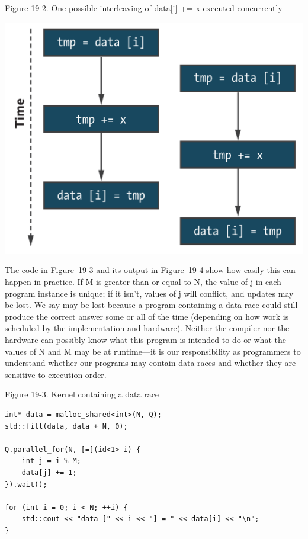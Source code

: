 \hspace*{\fill} \par %
Figure 19-2. One possible interleaving of data[i] += x executed 
concurrently
\begin{center}
	\includegraphics[width=1.0\textwidth]{content/chapter-19/images/3}
\end{center}

The code in Figure 19-3 and its output in Figure 19-4 show how easily this can happen in practice. If M is greater than or equal to N, the value of j in each program instance is unique; if it isn’t, values of j will conflict, and updates may be lost. We say may be lost because a program containing a data race could still produce the correct answer some or all of the time (depending on how work is scheduled by the implementation and hardware). Neither the compiler nor the hardware can possibly know what this program is intended to do or what the values of N and M may be at runtime—it is our responsibility as programmers to understand whether our programs may contain data races and whether they are sensitive to execution order.\par

\hspace*{\fill} \par %
Figure 19-3. Kernel containing a data race
\begin{lstlisting}[caption={}]
int* data = malloc_shared<int>(N, Q);
std::fill(data, data + N, 0);

Q.parallel_for(N, [=](id<1> i) {
	int j = i % M;
	data[j] += 1;
}).wait();

for (int i = 0; i < N; ++i) {
	std::cout << "data [" << i << "] = " << data[i] << "\n";
}
\end{lstlisting}

